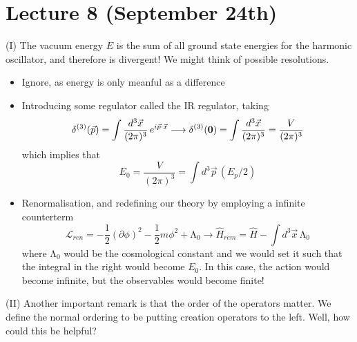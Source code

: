 \section{Lecture 8 (September 24th)}
\begin{rmk}
(I) The vacuum energy $E$ is the sum of all ground state energies for the harmonic oscillator, and therefore is divergent! We might think of possible resolutions. 
\begin{itemize}
\item[(i)] Ignore, as energy is only meanful as a difference 
\item[(ii)] Introducing some regulator called the IR regulator, taking
\[\delta ^{(3)}(\vec{p})=\int \dfrac{d^3\vec{x}}{(2\pi )^3}\,e^{i\vec{p}\cdot \vec{x}}\longrightarrow \delta ^{(3)}({\bf 0})=\int \dfrac{d^3\vec{x}}{(2\pi )^3}=\dfrac{V}{(2\pi )^3}\]
which implies that
\[E_{0}=\dfrac{V}{(2\pi )^3}=\int d^3\vec{p}\,(E_{p}/2)\]
\item[(iii)] Renormalisation, and redefining our theory by employing a infinite counterterm 
\[\mathcal{L}_{ren}=-\dfrac{1}{2}(\partial \phi )^2-\dfrac{1}{2}m\phi ^2+\mathrm{\Lambda }_{0}\longrightarrow \hat{H}_{rem}=\hat{H}-\int d^3\vec{x}\,\mathrm{\Lambda }_{0}\]
where $\mathrm{\Lambda }_{0}$ would be the cosmological constant and we would set it such that the integral in the right would become $E_0$. In this case, the action would become infinite, but the observables would become finite!
\end{itemize}
(II) Another important remark is that the order of the operators matter. We define the normal ordering to be putting creation operators to the left. Well, how could this be helpful? 

\bigskip 


\end{rmk}
